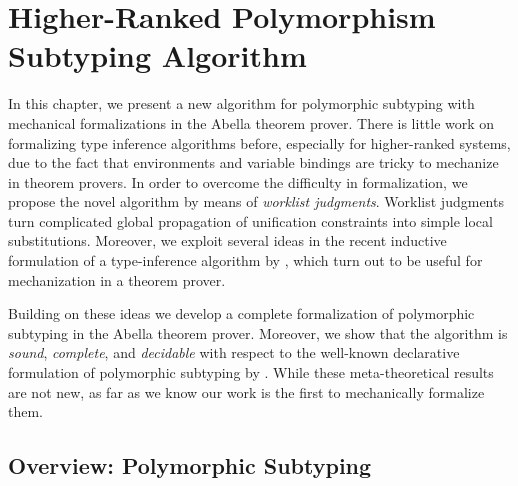 \chapter{Higher-Ranked Polymorphism Subtyping Algorithm}
\label{chap:ITP}

In this chapter, we present a new algorithm for polymorphic subtyping
with mechanical formalizations in the Abella theorem prover.
There is little work on formalizing type inference algorithms before,
especially for higher-ranked systems,
due to the fact that environments and variable bindings are
tricky to mechanize in theorem provers.
In order to overcome the difficulty in formalization,
we propose the novel algorithm by means of \emph{worklist judgments}.
Worklist judgments turn complicated
global propagation of unification constraints into simple local substitutions.
Moreover, we exploit several ideas in the recent inductive
formulation of a type-inference algorithm by
\citet{dunfield2013complete}, which turn out to be useful
for mechanization in a theorem prover.

Building on these ideas we develop a complete formalization of
polymorphic subtyping in the Abella theorem prover. Moreover, we
 show that the algorithm is \emph{sound}, \emph{complete}, and \emph{decidable} with
respect to the well-known declarative formulation of polymorphic subtyping by
\citet{odersky1996putting}.
While these meta-theoretical results are not new, as far
as we know our work is the first to mechanically formalize them.


\section{Overview: Polymorphic Subtyping}










